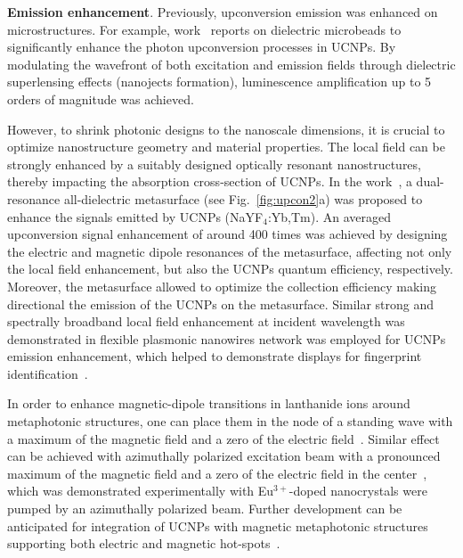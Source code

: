 \documentclass[journal=chreay,manuscript=review]{achemso}
\begin{document}
{\bf Emission enhancement}. Previously, upconversion emission was enhanced on microstructures. For example, work~\cite{liang2019upconversion} reports on dielectric microbeads to significantly enhance the photon upconversion processes in UCNPs. By modulating the wavefront of both excitation and emission fields through dielectric superlensing effects (nanojects formation), luminescence amplification up to 5 orders of magnitude was achieved.

However, to shrink photonic designs to the nanoscale dimensions, it is crucial to optimize nanostructure geometry and material properties. The local field can be strongly enhanced by a suitably designed optically resonant nanostructures, thereby impacting the absorption cross-section of UCNPs. In the work~\cite{gong2019upconversion}, a dual-resonance all-dielectric metasurface (see Fig.~\ref{fig:upcon2}a) was proposed to enhance the signals emitted by UCNPs (NaYF$_4$:Yb,Tm). An averaged upconversion signal enhancement of around 400 times was achieved by designing the electric and magnetic dipole resonances of the metasurface, affecting not only the local field enhancement, but also the UCNPs quantum efficiency, respectively. Moreover, the metasurface allowed to optimize the collection efficiency making directional the emission of the UCNPs on the metasurface. Similar strong and spectrally broadband local field enhancement at incident wavelength was demonstrated in flexible plasmonic nanowires network was employed for UCNPs emission enhancement, which helped to demonstrate displays for fingerprint identification~\cite{xu2018broadband}.

In order to enhance magnetic-dipole transitions in lanthanide ions around metaphotonic structures, one can place them in the
node of a standing wave with a maximum of the magnetic field and a zero of the electric field~\cite{yang2011local}. Similar effect can be achieved with azimuthally polarized excitation beam with a pronounced maximum of the magnetic field and a zero of the electric field in the center~\cite{kasperczyk2015excitation}, which was demonstrated experimentally with Eu$^{3+}$-doped nanocrystals were pumped by an azimuthally polarized beam. Further development can be anticipated for integration of UCNPs with magnetic metaphotonic structures supporting both electric and magnetic hot-spots~\cite{nazir2014fano, bakker2015magnetic, feng2017isotropic, zanganeh2021anapole}. 
\end{document}
